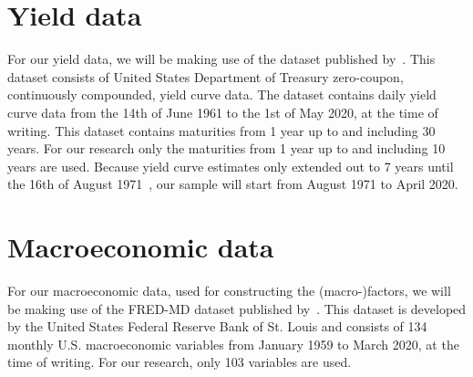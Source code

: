 \section{Yield data}
For our yield data, we will be making use of the dataset published by~\textcite{Grkaynak2007}. 
This dataset consists of United States Department of Treasury zero-coupon, continuously compounded, yield curve data. 
The dataset contains daily yield curve data from the 14th of June 1961 to the 1st of May 2020, at the time of writing. 
This dataset contains maturities from 1 year up to and including 30 years. 
For our research only the maturities from 1 year up to and including 10 years are used. 
Because yield curve estimates only extended out to 7 years until the 16th of August 1971~\parencite[see][p.~19]{Grkaynak2007}, our sample will start from August 1971 to April 2020. 

\section{Macroeconomic data}
For our macroeconomic data, used for constructing the (macro-)factors, we will be making use of the FRED-MD dataset published by~\textcite{McCracken2016}. 
This dataset is developed by the United States Federal Reserve Bank of St. Louis and consists of 134 monthly U.S. macroeconomic variables from January 1959 to March 2020, at the time of writing. 
For our research, only 103 variables are used.